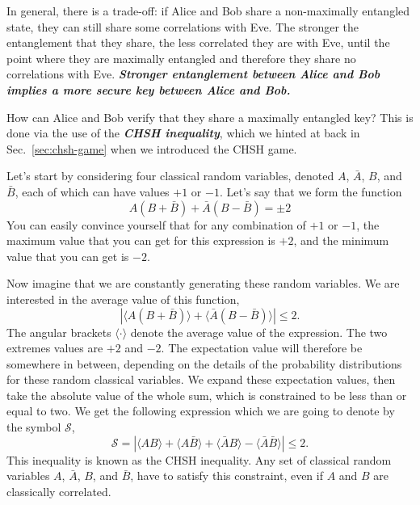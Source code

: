 In general, there is a trade-off: if Alice and Bob share a non-maximally entangled state, they can still share some correlations with Eve.
The stronger the entanglement that they share, the less correlated they are with Eve, until the point where they
are maximally entangled and therefore they share no correlations with Eve.
\textbf{\emph{Stronger entanglement between Alice and Bob implies a more secure key between Alice and Bob.}}

How can Alice and Bob verify that they share a maximally entangled key?
This is done via the use of the \textbf{\emph{CHSH inequality}}, which we hinted at back in Sec.~\ref{sec:chsh-game} when we introduced the CHSH game.

Let's start by considering four classical random variables, denoted $A$,
$\bar{A}$, $B$, and $\bar{B}$, each of which can have values $+1$ or $-1$.
Let's say that we form the function
\begin{equation}
    A(B+\bar{B})+\bar{A}(B-\bar{B})=\pm 2
\end{equation}
You can easily convince yourself that for any combination of $+1$ or $-1$, the maximum value that you can get for this expression is $+2$, and the minimum value that you can get is $-2$.

Now imagine that we are constantly generating these random variables.
We are interested in the average value of this function,
\begin{equation}
    |\langle A(B+\bar{B})\rangle+\langle\bar{A}(B-\bar{B})\rangle| \leq 2.
\end{equation}
The angular brackets $\langle\cdot\rangle$ denote the average value of the expression.
The two extremes values are $+2$ and $-2$.
The expectation value will therefore be somewhere in between, depending on the details of the probability distributions for these random classical variables.
We expand these expectation values, then take the absolute value of the whole sum, which is constrained to be less than or equal to two.
We get the following expression which we are going to denote by the symbol $\mathcal{S}$,
\begin{equation}
    \mathcal{S}=|\langle A B\rangle+\langle A \bar{B}\rangle+\langle\bar{A} B\rangle-\langle\bar{A} \bar{B}\rangle| \leq 2.
    \label{eq:chsh-inequality}
\end{equation}
This inequality is known as the CHSH inequality.
Any set of classical random variables $A$, $\bar{A}$, $B$, and $\bar{B}$, have to satisfy this constraint, even if $A$ and $B$ are classically correlated.

